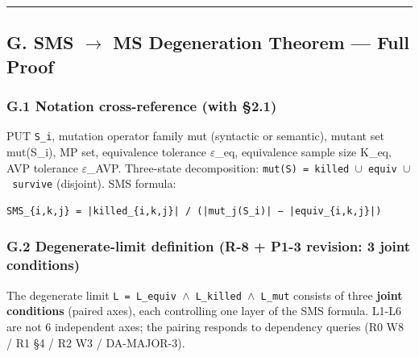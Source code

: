 \documentclass[review,12pt,authoryear]{elsarticle}
\begin{document}
\begin{center}\rule{0.5\linewidth}{0.5pt}\end{center}

\subsection{G. SMS $\to$ MS Degeneration Theorem --- Full
Proof}\label{g.-sms-ms-degeneration-theorem-full-proof}

\subsubsection{G.1 Notation cross-reference (with
§2.1)}\label{g.1-notation-cross-reference-with-2.1}

PUT \texttt{S\_i}, mutation operator family mut (syntactic or semantic),
mutant set mut(S\_i), MP set, equivalence tolerance $\varepsilon$\_eq, equivalence
sample size K\_eq, AVP tolerance $\varepsilon$\_AVP. Three-state decomposition:
\texttt{mut(S)\ =\ killed\ $\cup$\ equiv\ $\cup$\ survive} (disjoint). SMS
formula:

\begin{verbatim}
SMS_{i,k,j} = |killed_{i,k,j}| / (|mut_j(S_i)| − |equiv_{i,k,j}|)
\end{verbatim}

\subsubsection{G.2 Degenerate-limit definition (R-8 + P1-3 revision: 3
joint
conditions)}\label{g.2-degenerate-limit-definition-r-8-p1-3-revision-3-joint-conditions}

The degenerate limit \texttt{L\ =\ L\_equiv\ $\wedge$\ L\_killed\ $\wedge$\ L\_mut}
consists of three \textbf{joint conditions} (paired axes), each
controlling one layer of the SMS formula. L1-L6 are not 6 independent
axes; the pairing responds to dependency queries (R0 W8 / R1 §4 / R2 W3
/ DA-MAJOR-3).
\end{document}
